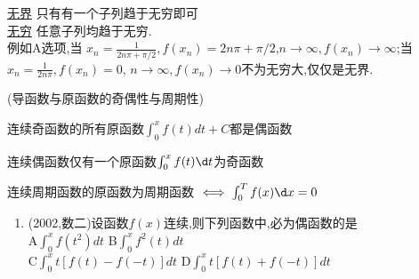 \documentclass[12pt, a4paper, oneside, UTF8]{ctexbook}
\begin{document}
\begin{tcolorbox}[title=无穷VS无界]
    \underline{无界} 只有有一个子列趋于无穷即可 \\
    \underline{无穷} 任意子列均趋于无穷.  \\
    例如A选项,当 $x_n=\frac{1}{2n\pi+\pi/2},f(x_n)=2n\pi+\pi/2$,$n\to\infty,f(x_n)\to\infty$;当
    $x_n=\frac{1}{2n\pi},f(x_n)=0$, $n\to\infty,f(x_n)\to 0$不为无穷大,仅仅是无界.
\end{tcolorbox}
\begin{remark}(导函数与原函数的奇偶性与周期性)
    \item 连续奇函数的所有原函数$\int_{0}^{x}f(t)dt+C$都是偶函数 

    \item 连续偶函数仅有一个原函数$\int_{0}^{x}f(t)\d t$为奇函数
    
    \item 连续周期函数的原函数为周期函数 $\iff\int_{0}^{T}f(x)\d x=0$
\end{remark}

\begin{enumerate}[label=\arabic*.,start=2]
    \item  (2002,数二)设函数$f(x)$连续,则下列函数中,必为偶函数的是 \\
    A\quad $\int_0^x f(t^2) dt$ \qquad\qquad
    B\quad $\int_0^x f^2(t) dt$ \\
    C\quad $\int_0^x t[f(t)-f(-t)] dt$ \qquad
    D\quad $\int_0^x t[f(t)+f(-t)] dt$

    
\end{enumerate}
\end{document}
